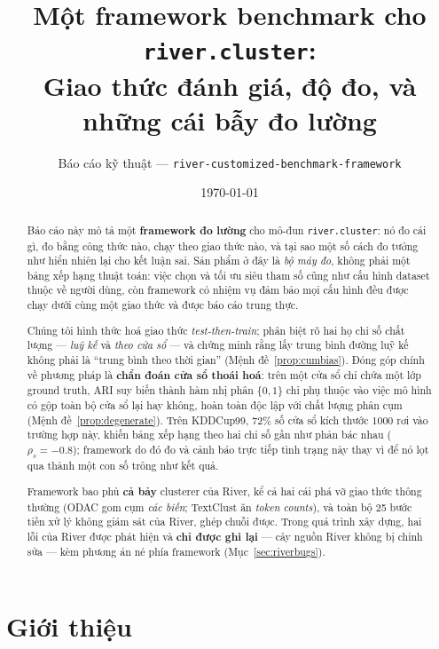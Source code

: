 \documentclass[11pt,a4paper]{article}
\title{\bfseries Một framework benchmark cho \texttt{river.cluster}:\\
Giao thức đánh giá, độ đo, và những cái bẫy đo lường}
\author{Báo cáo kỹ thuật --- \texttt{river-customized-benchmark-framework}}
\date{\today}
\theoremstyle{remark}
\begin{document}
\maketitle

\begin{abstract}
\noindent
Báo cáo này mô tả một \textbf{framework đo lường} cho mô-đun
\texttt{river.cluster}: nó đo cái gì, đo bằng công thức nào, chạy theo giao thức
nào, và tại sao một số cách đo tưởng như hiển nhiên lại cho kết luận sai. Sản
phẩm ở đây là \emph{bộ máy đo}, không phải một bảng xếp hạng thuật toán: việc
chọn và tối ưu siêu tham số cũng như cấu hình dataset thuộc về người dùng, còn
framework có nhiệm vụ đảm bảo mọi cấu hình đều được chạy dưới cùng một giao thức
và được báo cáo trung thực.

Chúng tôi hình thức hoá giao thức \emph{test-then-train}; phân biệt rõ hai họ chỉ
số chất lượng --- \emph{luỹ kế} và \emph{theo cửa sổ} --- và chứng minh rằng lấy
trung bình đường luỹ kế không phải là ``trung bình theo thời gian''
(Mệnh đề~\ref{prop:cumbias}). Đóng góp chính về phương pháp là \textbf{chẩn đoán
cửa sổ thoái hoá}: trên một cửa sổ chỉ chứa một lớp ground truth, ARI suy biến
thành hàm nhị phân $\{0,1\}$ chỉ phụ thuộc vào việc mô hình có gộp toàn bộ cửa sổ
lại hay không, hoàn toàn độc lập với chất lượng phân cụm
(Mệnh đề~\ref{prop:degenerate}). Trên KDDCup99, $72\%$ số cửa sổ kích thước
$1000$ rơi vào trường hợp này, khiến bảng xếp hạng theo hai chỉ số gần như phản
bác nhau ($\rho_s = -0.8$); framework do đó đo và cảnh báo trực tiếp tình trạng
này thay vì để nó lọt qua thành một con số trông như kết quả.

Framework bao phủ \textbf{cả bảy} clusterer của River, kể cả hai cái phá vỡ giao
thức thông thường (ODAC gom cụm \emph{các biến}; TextClust ăn \emph{token
counts}), và toàn bộ 25 bước tiền xử lý không giám sát của River, ghép chuỗi
được. Trong quá trình xây dựng, hai lỗi của River được phát hiện và \textbf{chỉ
được ghi lại} --- cây nguồn River không bị chỉnh sửa --- kèm phương án né phía
framework (Mục~\ref{sec:riverbugs}).
\end{abstract}

\tableofcontents
\newpage

\section{Giới thiệu}
\end{document}
